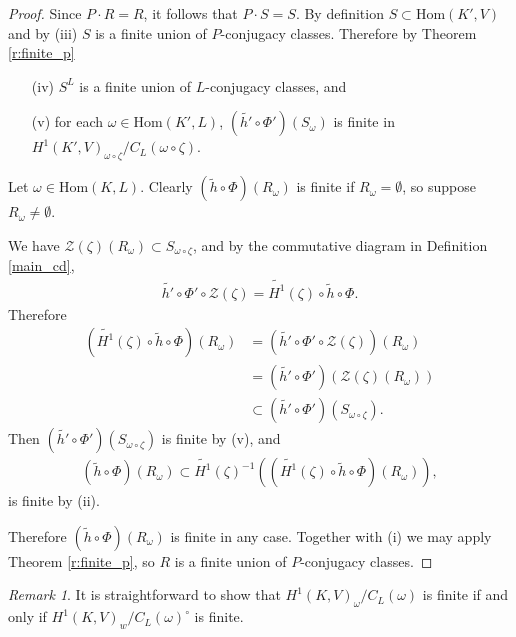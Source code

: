 \documentclass[12pt]{amsart}
\numberwithin{equation}{section}
\theoremstyle{definition}
\theoremstyle{remark}
\theoremstyle{remark}
\newtheorem*{Rem}{Remark}
\begin{document}
\begin{proof}
Since $P \cdot R = R$, it follows that $P\cdot S = S$. By definition $S \subset \mathrm{Hom}(K', V)$ and by (iii) $S$ is a finite union of $P$-conjugacy classes. Therefore by Theorem \ref{r:finite_p}
\begin{itemize}
\item[(iv)] $S^L$ is a finite union of $L$-conjugacy classes, and
\item[(v)] for each $\omega \in \mathrm{Hom}(K', L)$, $(\widetilde{h'} \circ \Phi')\left(S_\omega\right)$ is finite in $H^1(K', V)_{\omega\circ\zeta}/C_L(\omega\circ\zeta)$.
\end{itemize}

Let $\omega \in \mathrm{Hom}(K, L)$. Clearly $(\widetilde{h} \circ \Phi)\left(R_\omega\right)$ is finite if $R_\omega = \emptyset$, so suppose $R_\omega \neq \emptyset$. 

We have $\mathcal{Z}(\zeta)(R_\omega) \subset S_{\omega\circ\zeta}$, and by the commutative diagram in Definition \ref{main_cd},
\begin{align*}
\widetilde{h'} \circ \Phi' \circ \mathcal{Z}(\zeta) = \widetilde{H^1}(\zeta) \circ \widetilde{h} \circ \Phi.
\end{align*}
Therefore
\begin{align*}
\left(\widetilde{H^1}(\zeta) \circ \widetilde{h} \circ \Phi\right)(R_\omega) &= \left(\widetilde{h'} \circ \Phi' \circ \mathcal{Z}(\zeta)\right)(R_\omega) \\
&= (\widetilde{h'} \circ \Phi')\left(\mathcal{Z}(\zeta)(R_\omega)\right) \\
&\subset (\widetilde{h'} \circ \Phi')(S_{\omega\circ\zeta}).
\end{align*}
Then $\left(\widetilde{h'} \circ \Phi'\right)(S_{\omega\circ\zeta})$ is finite by (v), and
\begin{align*}
(\widetilde{h} \circ \Phi)(R_\omega) \subset \widetilde{H^1}(\zeta)^{-1} \left(\left(\widetilde{H^1}(\zeta) \circ \widetilde{h} \circ \Phi\right)(R_\omega)\right),
\end{align*}
is finite by (ii).

Therefore $(\widetilde{h} \circ \Phi)(R_\omega)$ is finite in any case. Together with (i) we may apply Theorem \ref{r:finite_p}, so $R$ is a finite union of $P$-conjugacy classes.
\end{proof}

\begin{Rem}
It is straightforward to show that 
$H^1(K, V)_\omega/C_L(\omega)$
is finite if and only if
\newline
$H^1(K, V)_w/C_L(\omega)^\circ$
is finite.
\end{Rem}
\end{document}
